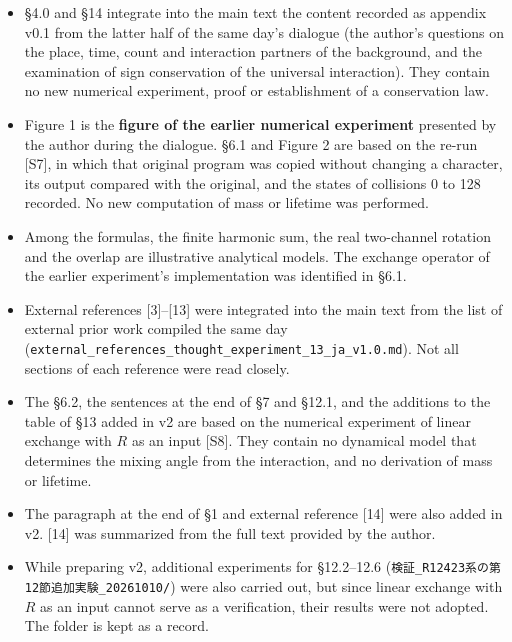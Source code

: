 \documentclass[
  a4paper,
]{article}
\providecommand{\tightlist}{%
  \setlength{\itemsep}{0pt}\setlength{\parskip}{0pt}}
\begin{document}
\begin{itemize}
\tightlist
\item
  §4.0 and §14 integrate into the main text the content recorded as
  appendix v0.1 from the latter half of the same day's dialogue (the
  author's questions on the place, time, count and interaction partners
  of the background, and the examination of sign conservation of the
  universal interaction). They contain no new numerical experiment,
  proof or establishment of a conservation law.
\item
  Figure 1 is the \textbf{figure of the earlier numerical experiment}
  presented by the author during the dialogue. §6.1 and Figure 2 are
  based on the re-run {[}S7{]}, in which that original program was
  copied without changing a character, its output compared with the
  original, and the states of collisions 0 to 128 recorded. No new
  computation of mass or lifetime was performed.
\item
  Among the formulas, the finite harmonic sum, the real two-channel
  rotation and the overlap are illustrative analytical models. The
  exchange operator of the earlier experiment's implementation was
  identified in §6.1.
\item
  External references {[}3{]}--{[}13{]} were integrated into the main
  text from the list of external prior work compiled the same day
  (\texttt{external\_\allowbreak{}references\_\allowbreak{}thought\_\allowbreak{}experiment\_\allowbreak{}13\_\allowbreak{}ja\_\allowbreak{}v1.0.md}).
  Not all sections of each reference were read closely.
\item
  The §6.2, the sentences at the end of §7 and §12.1, and the additions
  to the table of §13 added in v2 are based on the numerical experiment
  of linear exchange with \(R\) as an input {[}S8{]}. They contain no
  dynamical model that determines the mixing angle from the interaction,
  and no derivation of mass or lifetime.
\item
  The paragraph at the end of §1 and external reference {[}14{]} were
  also added in v2. {[}14{]} was summarized from the full text provided
  by the author.
\item
  While preparing v2, additional experiments for §12.2--12.6
  (\texttt{検証\_\allowbreak{}R12423系の第12節追加実験\_\allowbreak{}20261010/\allowbreak{}}) were also carried
  out, but since linear exchange with \(R\) as an input cannot serve as
  a verification, their results were not adopted. The folder is kept as
  a record.
\end{itemize}
\end{document}
